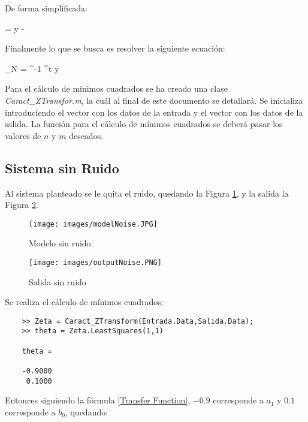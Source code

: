 \documentclass[a4paper, fontsize=11pt]{scrartcl} %
\numberwithin{equation}{section} %
\numberwithin{figure}{section} %
\numberwithin{table}{section} %
\newenvironment{myalign}{\par\nobreak\large\noindent\align}{\endalign} %
\begin{document}
	De forma simplificada:
	
	\begin{myalign}
		\epsilon = y -\Phi \cdot \theta
	\end{myalign}
	
	Finalmente lo que se busca es resolver la siguiente ecuación:
	
	\begin{myalign}
		\hat{\theta}_N = ^{-1} \cdot \Phi^t \cdot y
	\end{myalign}
	
	
	Para el cálculo de mínimos cuadrados se ha creado una clase \textit{Caract\_ZTransfor.m}, la cuál al final de este documento se detallará. Se inicializa introduciendo el vector con los datos de la entrada y el vector con los datos de la salida. La función para el cálculo de mínimos cuadrados se deberá pasar los valores de $n$ y $m$ deseados.
		
	\subsection{Sistema sin Ruido}
	
	Al sistema planteado se le quita el ruido, quedando la Figura \ref{Modelo sin ruido}, y la salida la Figura \ref{Salida sin ruido}.
	
	\begin{figure}[h!]
		\centering
		\texttt{[image: images/modelNoise.JPG]}
		\caption{Modelo sin ruido}
		\label{Modelo sin ruido}
	\end{figure}
	\FloatBarrier
	
	\begin{figure}[h!]
		\centering
		\texttt{[image: images/outputNoise.PNG]}
		\caption{Salida sin ruido}
		\label{Salida sin ruido}
	\end{figure}
	\FloatBarrier
	
	Se realiza el cálculo de mínimos cuadrados:
	
	\begin{lstlisting}
	>> Zeta = Caract_ZTransform(Entrada.Data,Salida.Data);
	>> theta = Zeta.LeastSquares(1,1)
	
	theta =
	
	-0.9000
	 0.1000
	\end{lstlisting}
	
	
	Entonces siguiendo la fórmula \ref{Transfer Function}, $-0.9$ corresponde a $a_1$ y $0.1$ corresponde a $b_0$, quedando:
	
\end{document}
